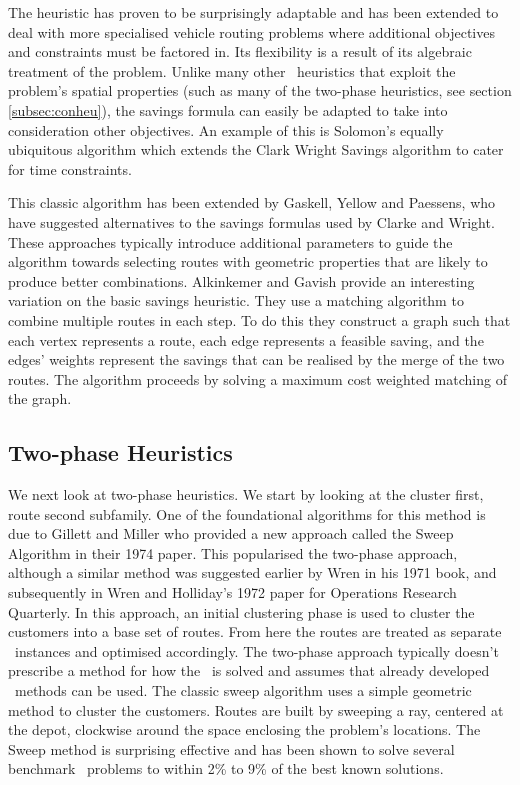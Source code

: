 The heuristic has proven to be surprisingly adaptable and has been extended to deal with more specialised vehicle routing problems where additional objectives and constraints must be factored in. Its flexibility is a result of its algebraic treatment of the problem\cite{Laporte:1999}. Unlike many other \VRP\ heuristics that exploit the problem's spatial properties (such as many of the two-phase heuristics, see section \ref{subsec:conheu}), the savings formula can easily be adapted to take into consideration other objectives. An example of this is Solomon's equally ubiquitous algorithm \cite{Solomon:1987} which extends the Clark Wright Savings algorithm to cater for time constraints. 

This classic algorithm has been extended by Gaskell\cite{Gaskell:1967}, Yellow\cite{Yellow:1970} and Paessens\cite{Paessens:1988}, who have suggested alternatives to the savings formulas used by Clarke and Wright. These approaches typically introduce additional parameters to guide the algorithm towards selecting routes with geometric properties that are likely to produce better combinations. Alkinkemer and Gavish provide an interesting variation on the basic savings heuristic\cite{AG:1991}. They use a matching algorithm to combine multiple routes in each step. To do this they construct a graph such that each vertex represents a route, each edge represents a feasible saving, and the edges' weights represent the savings that can be realised by the merge of the two routes. The algorithm proceeds by solving a maximum cost weighted matching of the graph.

\subsection{Two-phase Heuristics}
\label{sec:tph}

We next look at two-phase heuristics. We start by looking at the cluster first, route second subfamily. One of the foundational algorithms for this method is due to Gillett and Miller who provided a new approach called the Sweep Algorithm in their 1974 paper\cite{GM:1974}. This popularised the two-phase approach, although a similar method was suggested earlier by Wren in his 1971 book, and subsequently in Wren and Holliday's 1972 paper for Operations Research Quarterly. In this approach, an initial clustering phase is used to cluster the customers into a base set of routes. From here the routes are treated as separate \TSP\ instances and optimised accordingly. The two-phase approach typically doesn't prescribe a method for how the \TSP\ is solved and assumes that already developed \TSP\ methods can be used. The classic sweep algorithm uses a simple geometric method to cluster the customers. Routes are built by sweeping a ray, centered at the depot, clockwise around the space enclosing the problem's locations. The Sweep method is surprising effective and has been shown to solve several benchmark \VRP\ problems to within 2\% to 9\% of the best known solutions\cite{TV2001}.

